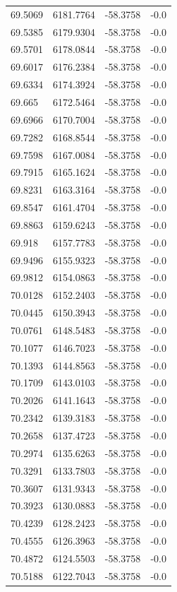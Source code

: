 \begin{table}[H]
\begin{tabular}{llll}
69.5069 & 6181.7764 & -58.3758 & -0.0 \\
69.5385 & 6179.9304 & -58.3758 & -0.0 \\
69.5701 & 6178.0844 & -58.3758 & -0.0 \\
69.6017 & 6176.2384 & -58.3758 & -0.0 \\
69.6334 & 6174.3924 & -58.3758 & -0.0 \\
69.665 & 6172.5464 & -58.3758 & -0.0 \\
69.6966 & 6170.7004 & -58.3758 & -0.0 \\
69.7282 & 6168.8544 & -58.3758 & -0.0 \\
69.7598 & 6167.0084 & -58.3758 & -0.0 \\
69.7915 & 6165.1624 & -58.3758 & -0.0 \\
69.8231 & 6163.3164 & -58.3758 & -0.0 \\
69.8547 & 6161.4704 & -58.3758 & -0.0 \\
69.8863 & 6159.6243 & -58.3758 & -0.0 \\
69.918 & 6157.7783 & -58.3758 & -0.0 \\
69.9496 & 6155.9323 & -58.3758 & -0.0 \\
69.9812 & 6154.0863 & -58.3758 & -0.0 \\
70.0128 & 6152.2403 & -58.3758 & -0.0 \\
70.0445 & 6150.3943 & -58.3758 & -0.0 \\
70.0761 & 6148.5483 & -58.3758 & -0.0 \\
70.1077 & 6146.7023 & -58.3758 & -0.0 \\
70.1393 & 6144.8563 & -58.3758 & -0.0 \\
70.1709 & 6143.0103 & -58.3758 & -0.0 \\
70.2026 & 6141.1643 & -58.3758 & -0.0 \\
70.2342 & 6139.3183 & -58.3758 & -0.0 \\
70.2658 & 6137.4723 & -58.3758 & -0.0 \\
70.2974 & 6135.6263 & -58.3758 & -0.0 \\
70.3291 & 6133.7803 & -58.3758 & -0.0 \\
70.3607 & 6131.9343 & -58.3758 & -0.0 \\
70.3923 & 6130.0883 & -58.3758 & -0.0 \\
70.4239 & 6128.2423 & -58.3758 & -0.0 \\
70.4555 & 6126.3963 & -58.3758 & -0.0 \\
70.4872 & 6124.5503 & -58.3758 & -0.0 \\
70.5188 & 6122.7043 & -58.3758 & -0.0 \\

\end{tabular}
\end{table}
